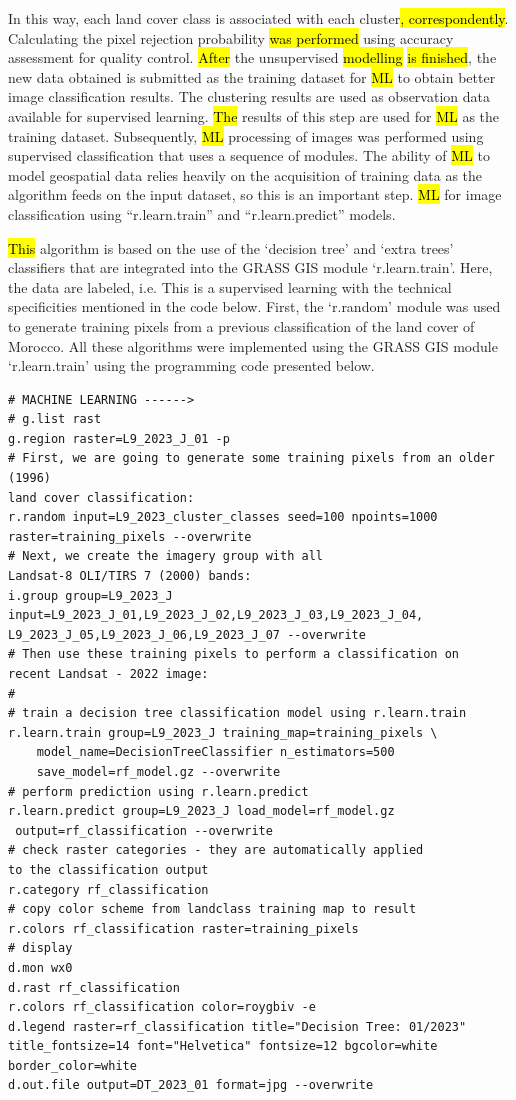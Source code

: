 \documentclass[geomatics,article,submit,pdftex,moreauthors]{Definitions/mdpi}
\begin{document}
In this way, each land cover class is associated with each cluster\hl{, correspondently}. Calculating the pixel rejection probability \hl{was performed }using accuracy assessment for quality control. \hl{After} the unsupervised \hl{modelling} \hl{is finished}, the new data obtained is submitted as the training dataset for \hl{ML} to obtain better image classification results. The clustering results are used as observation data available for supervised learning. \hl{The} results of this step are used for \hl{ML} as the training dataset.\hl{ }Subsequently, \hl{ML} processing of images was performed using supervised classification that uses a sequence of modules. The ability of \hl{ML} to model geospatial data relies heavily on the acquisition of training data as the algorithm feeds on the input dataset, so this is an important step. \hl{ML} for image classification using “r.learn.train” and “r.learn.predict” models.\hl{ }

\hl{This} algorithm is based on the use of the ‘decision tree’ and ‘extra trees’ classifiers that are integrated into the GRASS GIS module ‘r.learn.train’. Here, the data are labeled, i.e. This is a supervised learning with the technical specificities mentioned in the code below. First, the ‘r.random’ module was used to generate training pixels from a previous classification of the land cover of Morocco. All these algorithms were implemented using the GRASS GIS module ‘r.learn.train’ using the programming code presented below.

\begin{footnotesize}
\begin{verbatim}
# MACHINE LEARNING ------>
# g.list rast
g.region raster=L9_2023_J_01 -p
# First, we are going to generate some training pixels from an older (1996) 
land cover classification:
r.random input=L9_2023_cluster_classes seed=100 npoints=1000 
raster=training_pixels --overwrite
# Next, we create the imagery group with all 
Landsat-8 OLI/TIRS 7 (2000) bands:
i.group group=L9_2023_J 
input=L9_2023_J_01,L9_2023_J_02,L9_2023_J_03,L9_2023_J_04,
L9_2023_J_05,L9_2023_J_06,L9_2023_J_07 --overwrite
# Then use these training pixels to perform a classification on 
recent Landsat - 2022 image:
#
# train a decision tree classification model using r.learn.train
r.learn.train group=L9_2023_J training_map=training_pixels \
    model_name=DecisionTreeClassifier n_estimators=500 
    save_model=rf_model.gz --overwrite
# perform prediction using r.learn.predict
r.learn.predict group=L9_2023_J load_model=rf_model.gz
 output=rf_classification --overwrite
# check raster categories - they are automatically applied 
to the classification output
r.category rf_classification
# copy color scheme from landclass training map to result
r.colors rf_classification raster=training_pixels
# display
d.mon wx0
d.rast rf_classification
r.colors rf_classification color=roygbiv -e
d.legend raster=rf_classification title="Decision Tree: 01/2023" 
title_fontsize=14 font="Helvetica" fontsize=12 bgcolor=white 
border_color=white
d.out.file output=DT_2023_01 format=jpg --overwrite
\end{verbatim}
\end{footnotesize}
\end{document}
